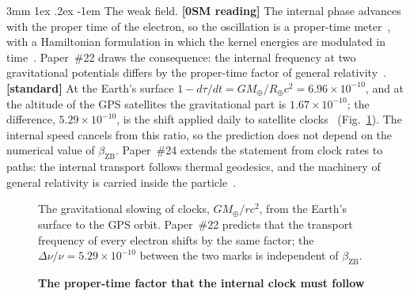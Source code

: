 \documentclass[%
 reprint, amsmath,amssymb, aps, prb, ]{revtex4-2}
\makeatletter
\numberwithin{equation}{section}
\renewcommand\paragraph{%
  \@startsection{paragraph}{4}{\z@}%
    {3mm \@plus 1ex \@minus .2ex}%
    {-1em}%
    {\normalfont\normalsize\itshape}}
\newcommand{\betaZB}{\beta_{\text{ZB}}}
\makeatother
\begin{document}
\paragraph{The weak field.} \textbf{[0SM reading]} The internal phase advances with the proper time of the electron, so the oscillation is a proper-time meter~\cite{hanamura11}, with a Hamiltonian formulation in which the kernel energies are modulated in time~\cite{hanamura18}. Paper~\#22 draws the consequence: the internal frequency at two gravitational potentials differs by the proper-time factor of general relativity~\cite{hanamura22}. \textbf{[standard]} At the Earth's surface $1 - d\tau/dt = GM_\oplus/R_\oplus c^{2} = 6.96\times10^{-10}$, and at the altitude of the GPS satellites the gravitational part is $1.67\times10^{-10}$; the difference, $5.29\times10^{-10}$, is the shift applied daily to satellite clocks~\cite{Ashby2003} (Fig.~\ref{fig:clockrate}). The internal speed cancels from this ratio, so the prediction does not depend on the numerical value of $\betaZB$. Paper~\#24 extends the statement from clock rates to paths: the internal transport follows thermal geodesics, and the machinery of general relativity is carried inside the particle~\cite{hanamura24}.

\begin{figure}[t!]
\centering
{}
\caption{\textbf{The proper-time factor that the internal clock must follow}}
\label{fig:clockrate}
\vspace{0.4em}
\begin{minipage}{0.95\columnwidth}
\justifying\small
The gravitational slowing of clocks, $GM_\oplus/rc^{2}$, from the Earth's surface to the GPS orbit. Paper~\#22 predicts that the transport frequency of every electron shifts by the same factor; the $\Delta\nu/\nu = 5.29\times10^{-10}$ between the two marks is independent of $\betaZB$.
\end{minipage}
\end{figure}
\end{document}
